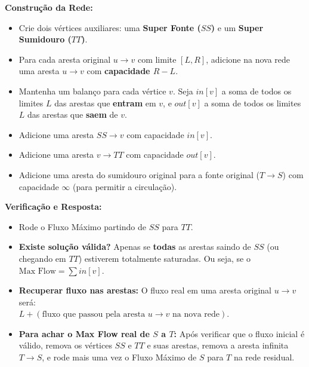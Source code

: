 \textbf{Construção da Rede:}
\begin{itemize}
    \item Crie dois vértices auxiliares: uma \textbf{Super Fonte ($SS$)} e um \textbf{Super Sumidouro ($TT$)}.
    \item Para cada aresta original $u \to v$ com limite $[L, R]$, adicione na nova rede uma aresta $u \to v$ com \textbf{capacidade $R - L$}.
    \item Mantenha um balanço para cada vértice $v$. Seja $in[v]$ a soma de todos os limites $L$ das arestas que \textbf{entram} em $v$, e $out[v]$ a soma de todos os limites $L$ das arestas que \textbf{saem} de $v$.
    \item Adicione uma aresta $SS \to v$ com capacidade $in[v]$.
    \item Adicione uma aresta $v \to TT$ com capacidade $out[v]$.
    \item Adicione uma aresta do sumidouro original para a fonte original ($T \to S$) com capacidade $\infty$ (para permitir a circulação).
\end{itemize}

\textbf{Verificação e Resposta:}
\begin{itemize}
    \item Rode o Fluxo Máximo partindo de $SS$ para $TT$.
    \item \textbf{Existe solução válida?} Apenas se \textbf{todas} as arestas saindo de $SS$ (ou chegando em $TT$) estiverem totalmente saturadas. Ou seja, se o $\text{Max Flow} = \sum in[v]$.
    \item \textbf{Recuperar fluxo nas arestas:} O fluxo real em uma aresta original $u \to v$ será: \\
    $L + (\text{fluxo que passou pela aresta } u \to v \text{ na nova rede})$.
    \item \textbf{Para achar o Max Flow real de $S$ a $T$:} Após verificar que o fluxo inicial é válido, remova os vértices $SS$ e $TT$ e suas arestas, remova a aresta infinita $T \to S$, e rode mais uma vez o Fluxo Máximo de $S$ para $T$ na rede residual.
\end{itemize}
